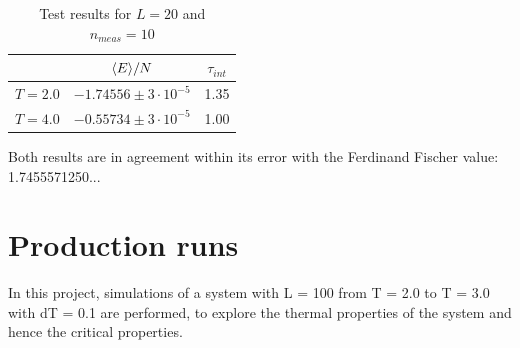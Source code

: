 \documentclass[article]{revtex4}
\newcommand{\qdist}[1]{\ifmmode\langle#1\rangle\else\textlangle#1\textrangle\fi}
\begin{document}
\begin{table}[h!]
\center
\begin{tabular}{|c|c|c|}
\hline
&$\qdist{E}/N $ & $ \tau_{int} $\\
\hline
$T = 2.0$ &$-1.74556 \pm 3 \cdot10^{-5}$&1.35\\
\hline
$T = 4.0$&$-0.55734 \pm 3 \cdot10^{-5}$&1.00\\
\hline
\end{tabular}
\center
\caption{Test results for $L = 20$ and $n_{meas}=10$}
\end{table}
Both results are in agreement within its error with the Ferdinand Fischer value: 1.7455571250...\\

\section{Production runs}

In this project, simulations of a system with L = 100 from T = 2.0 to T = 3.0 with dT = 0.1 are performed, to explore the thermal properties of the system and hence the critical properties. 
\end{document}
